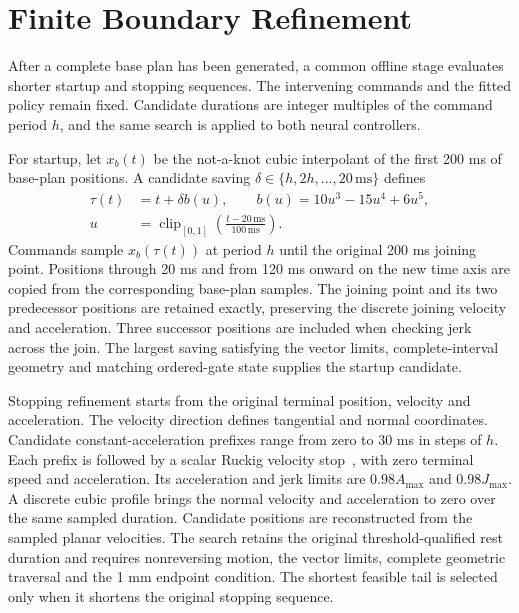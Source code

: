 \documentclass[preprint,12pt]{elsarticle}
\begin{document}
\section{Finite Boundary Refinement}
\label{app:boundary}
After a complete base plan has been generated, a common offline stage evaluates shorter startup and stopping sequences. The intervening commands and the fitted policy remain fixed. Candidate durations are integer multiples of the command period $h$, and the same search is applied to both neural controllers.

For startup, let $x_b(t)$ be the not-a-knot cubic interpolant of the first 200 ms of base-plan positions. A candidate saving $\delta\in\{h,2h,\ldots,20\,\mathrm{ms}\}$ defines
\begin{equation}
\begin{aligned}
\tau(t)&=t+\delta b(u),\qquad
b(u)=10u^3-15u^4+6u^5,\\
u&=\operatorname{clip}_{[0,1]}\!\left(\frac{t-20\,\mathrm{ms}}{100\,\mathrm{ms}}\right).
\end{aligned}
\label{eq:boundary_time_map}
\end{equation}
Commands sample $x_b(\tau(t))$ at period $h$ until the original 200 ms joining point. Positions through 20 ms and from 120 ms onward on the new time axis are copied from the corresponding base-plan samples. The joining point and its two predecessor positions are retained exactly, preserving the discrete joining velocity and acceleration. Three successor positions are included when checking jerk across the join. The largest saving satisfying the vector limits, complete-interval geometry and matching ordered-gate state supplies the startup candidate.

Stopping refinement starts from the original terminal position, velocity and acceleration. The velocity direction defines tangential and normal coordinates. Candidate constant-acceleration prefixes range from zero to 30 ms in steps of $h$. Each prefix is followed by a scalar Ruckig velocity stop~\citep{Berscheid2021Ruckig}, with zero terminal speed and acceleration. Its acceleration and jerk limits are $0.98A_{\max}$ and $0.98J_{\max}$. A discrete cubic profile brings the normal velocity and acceleration to zero over the same sampled duration. Candidate positions are reconstructed from the sampled planar velocities. The search retains the original threshold-qualified rest duration and requires nonreversing motion, the vector limits, complete geometric traversal and the 1 mm endpoint condition. The shortest feasible tail is selected only when it shortens the original stopping sequence.
\end{document}
